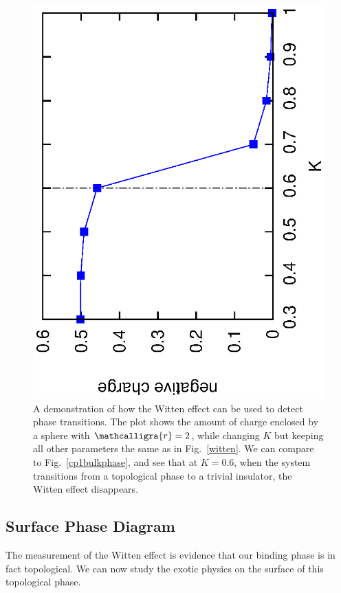 \documentclass[prb,twocolumn]{revtex4-1}
\newcommand{\scripty}[1]{\ensuremath{\mathcalligra{#1}}}
\begin{document}
\begin{figure}
\includegraphics[angle=-90,width=0.9\linewidth]{figures/wittenphase.eps}
\caption{A demonstration of how the Witten effect can be used to detect phase transitions. The plot shows the amount of charge enclosed by a sphere with $\scripty{r}=2$, while changing $K$ but keeping all other parameters the same as in Fig.~\ref{witten}. We can compare to Fig.~\ref{cp1bulkphase}, and see that at $K=0.6$, when the system transitions from a topological phase to a trivial insulator, the Witten effect disappears.}
\label{wittenphase}
\end{figure}


\subsection{Surface Phase Diagram}

The measurement of the Witten effect is evidence that our binding phase is in fact topological. We can now study the exotic physics on the surface of this topological phase.
\end{document}
